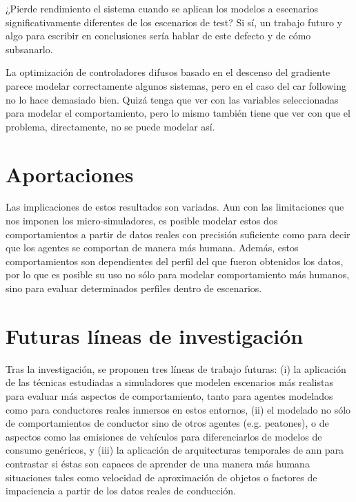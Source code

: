 ¿Pierde rendimiento el sistema cuando se aplican los modelos a escenarios significativamente diferentes de los escenarios de test? Si sí, un trabajo futuro y algo para escribir en conclusiones sería hablar de este defecto y de cómo subsanarlo.

La optimización de controladores difusos basado en el descenso del gradiente parece modelar correctamente algunos sistemas, pero en el caso del car following no lo hace demasiado bien. Quizá tenga que ver con las variables seleccionadas para modelar el comportamiento, pero lo mismo también tiene que ver con que el problema, directamente, no se puede modelar así.

\section{Aportaciones}
\label{ch:conclusions:contributions}


Las implicaciones de estos resultados son variadas. Aun con las limitaciones que nos imponen los micro-simuladores, es posible modelar estos dos comportamientos a partir de datos reales con precisión suficiente como para decir que los agentes se comportan de manera más humana. Además, estos comportamientos son dependientes del perfil del que fueron obtenidos los datos, por lo que es posible su uso no sólo para modelar comportamiento más humanos, sino para evaluar determinados perfiles dentro de escenarios.

\section{Futuras líneas de investigación}
\label{ch:conclusions:future-work}


Tras la investigación, se proponen tres líneas de trabajo futuras: (i) la aplicación de las técnicas estudiadas a simuladores que modelen escenarios más realistas para evaluar más aspectos de comportamiento, tanto para agentes modelados como para conductores reales inmersos en estos entornos, (ii) el modelado no sólo de comportamientos de conductor sino de otros agentes (e.g. peatones), o de aspectos como las emisiones de vehículos para diferenciarlos de modelos de consumo genéricos, y (iii) la aplicación de arquitecturas temporales de \ac{ann} para contrastar si éstas son capaces de aprender de una manera más humana situaciones tales como velocidad de aproximación de objetos o factores de impaciencia  a partir de los datos reales de conducción.

